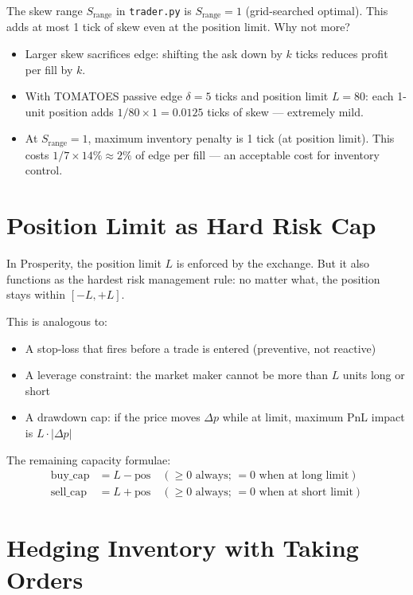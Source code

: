 \documentclass[12pt,a4paper,openany]{report}
\theoremstyle{definition}
\begin{document}
The skew range $S_{\text{range}}$ in \texttt{trader.py} is $S_{\text{range}} = 1$ (grid-searched optimal). This adds at most 1 tick of skew even at the position limit. Why not more?
\begin{itemize}
  \item Larger skew sacrifices edge: shifting the ask down by $k$ ticks reduces profit per fill by $k$.
  \item With TOMATOES passive edge $\delta = 5$ ticks and position limit $L = 80$: each 1-unit position adds $1/80 \times 1 = 0.0125$ ticks of skew — extremely mild.
  \item At $S_{\text{range}} = 1$, maximum inventory penalty is 1 tick (at position limit). This costs $1/7\times 14\% \approx 2\%$ of edge per fill — an acceptable cost for inventory control.
\end{itemize}

\section{Position Limit as Hard Risk Cap}

In Prosperity, the position limit $L$ is enforced by the exchange. But it also functions as the hardest risk management rule: no matter what, the position stays within $[-L, +L]$.

This is analogous to:
\begin{itemize}
  \item A stop-loss that fires before a trade is entered (preventive, not reactive)
  \item A leverage constraint: the market maker cannot be more than $L$ units long or short
  \item A drawdown cap: if the price moves $\Delta p$ while at limit, maximum PnL impact is $L \cdot |\Delta p|$
\end{itemize}

The remaining capacity formulae:
\begin{align}
  \text{buy\_cap} &= L - \text{pos} \quad (\geq 0 \text{ always; } = 0 \text{ when at long limit}) \\
  \text{sell\_cap} &= L + \text{pos} \quad (\geq 0 \text{ always; } = 0 \text{ when at short limit})
\end{align}

\section{Hedging Inventory with Taking Orders}
\end{document}
